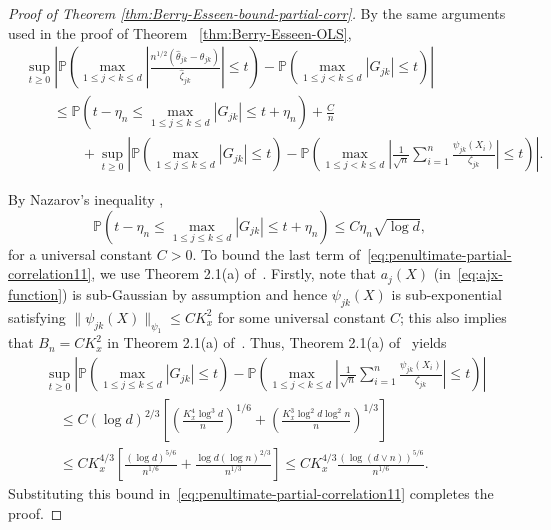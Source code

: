 \documentclass[11pt]{article}
\begin{document}
\begin{appendices}
\begin{proof}[Proof of Theorem \ref{thm:Berry-Esseen-bound-partial-corr}]
By the same arguments used in the proof of Theorem ~\ref{thm:Berry-Esseen-OLS}, 
\begin{equation}\label{eq:penultimate-partial-correlation11}
\begin{split}
&\sup_{t\ge0}\left|\mathbb{P}\left(\max_{1\le j < k\le d}\left|\frac{n^{1/2}(\widehat{\theta}_{jk} - \theta_{jk})}{\widehat{\zeta}_{jk}}\right| \le t\right) - \mathbb{P}\left(\max_{1\le j < k\le d}|G_{jk}| \le t\right)\right|\\ 
&\qquad\le \mathbb{P}\left(t - \eta_n \le \max_{1\le j \le k\le d}|G_{jk}| \le t + \eta_n\right) + \frac{C}{n}\\
&\qquad\qquad+ \sup_{t\ge0}\left|\mathbb{P}\left(\max_{1\le j\le k \le d}|G_{jk}| \le t\right) - \mathbb{P}\left(\max_{1\le j < k\le d}\left|\frac{1}{\sqrt{n}}\sum_{i=1}^n \frac{\psi_{jk}(X_i)}{\zeta_{jk}}\right| \le t\right)\right|.
\end{split}
\end{equation}

By Nazarov's inequality  \citep[see Lemma A.1 in][]{chernozhukov2017detailed},
\[
\mathbb{P}\left(t - \eta_n \le \max_{1\le j \le k\le d}|G_{jk}| \le t + \eta_n\right) \le C  \eta_n\sqrt{\log d},
\]
for a universal constant $C>0$. 
To bound the last term of~\eqref{eq:penultimate-partial-correlation11}, we use Theorem 2.1(a) of~\cite{koike2019notes}. Firstly, note that $a_j(X)$ (in~\eqref{eq:ajx-function}) is sub-Gaussian by assumption and hence $\psi_{jk}(X)$ is sub-exponential satisfying $\|\psi_{jk}(X)\|_{\psi_1} \le CK_x^2$ for some universal constant $C$; this also implies that $B_n = CK_x^2$ in Theorem 2.1(a) of~\cite{koike2019notes}. Thus, Theorem 2.1(a) of~\cite{koike2019notes} yields
\begin{equation}
\begin{split}
&\sup_{t\ge0}\left|\mathbb{P}\left(\max_{1\le j\le k \le d}|G_{jk}| \le t\right) - \mathbb{P}\left(\max_{1\le j < k\le d}\left|\frac{1}{\sqrt{n}}\sum_{i=1}^n \frac{\psi_{jk}(X_i)}{\zeta_{jk}}\right| \le t\right)\right|\\ 
&\quad\le C(\log d)^{2/3}\left[\left(\frac{K_x^4\log^3d}{n}\right)^{1/6} + \left(\frac{K_x^3\log^2d\log^2n}{n}\right)^{1/3}\right]\\
&\quad\le CK_x^{4/3}\left[\frac{(\log d)^{5/6}}{n^{1/6}} + \frac{\log d(\log n)^{2/3}}{n^{1/3}}\right] \le CK_x^{4/3}\frac{(\log(d\vee n))^{5/6}}{n^{1/6}}.
\end{split}
\end{equation}
Substituting this bound in~\eqref{eq:penultimate-partial-correlation11} completes the proof.
\end{proof}


\end{appendices}
\end{document}
